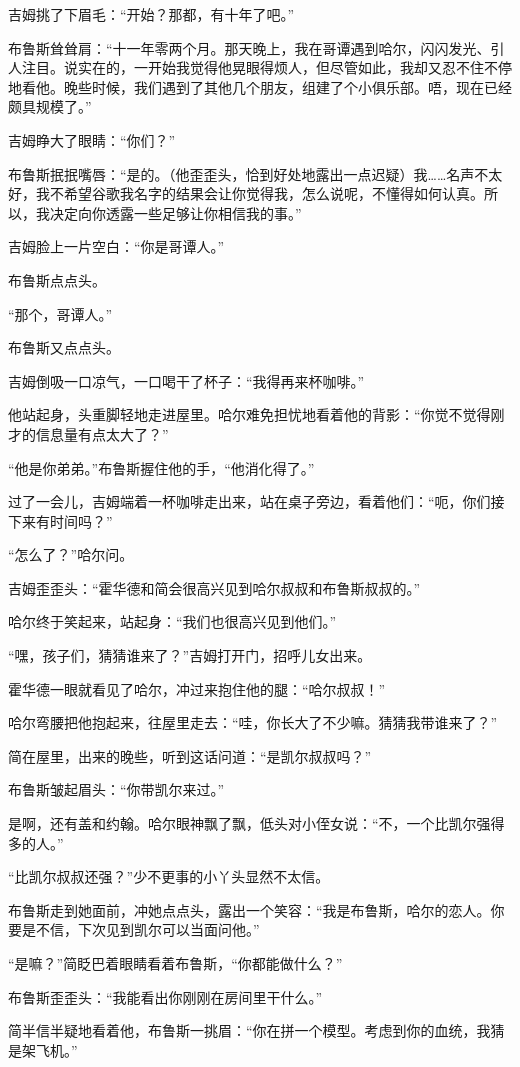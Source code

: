 \documentclass[../main]{subfiles}
\begin{document}
吉姆挑了下眉毛：“开始？那都，有十年了吧。”

布鲁斯耸耸肩：“十一年零两个月。那天晚上，我在哥谭遇到哈尔，闪闪发光、引人注目。说实在的，一开始我觉得他晃眼得烦人，但尽管如此，我却又忍不住不停地看他。晚些时候，我们遇到了其他几个朋友，组建了个小俱乐部。唔，现在已经颇具规模了。”

吉姆睁大了眼睛：“你们？”

布鲁斯抿抿嘴唇：“是的。（他歪歪头，恰到好处地露出一点迟疑）我……名声不太好，我不希望谷歌我名字的结果会让你觉得我，怎么说呢，不懂得如何认真。所以，我决定向你透露一些足够让你相信我的事。”

吉姆脸上一片空白：“你是哥谭人。”

布鲁斯点点头。

“那个，哥谭人。”

布鲁斯又点点头。

吉姆倒吸一口凉气，一口喝干了杯子：“我得再来杯咖啡。”

他站起身，头重脚轻地走进屋里。哈尔难免担忧地看着他的背影：“你觉不觉得刚才的信息量有点太大了？”

“他是你弟弟。”布鲁斯握住他的手，“他消化得了。”

过了一会儿，吉姆端着一杯咖啡走出来，站在桌子旁边，看着他们：“呃，你们接下来有时间吗？”

“怎么了？”哈尔问。

吉姆歪歪头：“霍华德和简会很高兴见到哈尔叔叔和布鲁斯叔叔的。”

哈尔终于笑起来，站起身：“我们也很高兴见到他们。”

“嘿，孩子们，猜猜谁来了？”吉姆打开门，招呼儿女出来。

霍华德一眼就看见了哈尔，冲过来抱住他的腿：“哈尔叔叔！”

哈尔弯腰把他抱起来，往屋里走去：“哇，你长大了不少嘛。猜猜我带谁来了？”

简在屋里，出来的晚些，听到这话问道：“是凯尔叔叔吗？”

布鲁斯皱起眉头：“你带凯尔来过。”

是啊，还有盖和约翰。哈尔眼神飘了飘，低头对小侄女说：“不，一个比凯尔强得多的人。”

“比凯尔叔叔还强？”少不更事的小丫头显然不太信。

布鲁斯走到她面前，冲她点点头，露出一个笑容：“我是布鲁斯，哈尔的恋人。你要是不信，下次见到凯尔可以当面问他。”

“是嘛？”简眨巴着眼睛看着布鲁斯，“你都能做什么？”

布鲁斯歪歪头：“我能看出你刚刚在房间里干什么。”

简半信半疑地看着他，布鲁斯一挑眉：“你在拼一个模型。考虑到你的血统，我猜是架飞机。”
\end{document}
